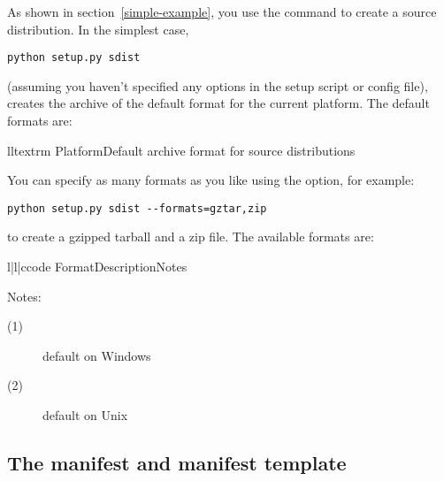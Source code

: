\documentclass{howto}
\begin{document}
As shown in section~\ref{simple-example}, you use the
 command to create a source distribution.  In the
simplest case,
\begin{verbatim}
python setup.py sdist
\end{verbatim}
(assuming you haven't specified any  options in the setup
script or config file),  creates the archive of the
default format for the current platform.  The default formats are:
\begin{tableii}{ll}{textrm}%
  {Platform}{Default archive format for source distributions}
\end{tableii}
You can specify as many formats as you like using the
 option, for example:
\begin{verbatim}
python setup.py sdist --formats=gztar,zip
\end{verbatim}
to create a gzipped tarball and a zip file.  The available formats are:
\begin{tableiii}{l|l|c}{code}%
  {Format}{Description}{Notes}
\end{tableiii}

\noindent Notes:
\begin{description}
\item[(1)] default on Windows
\item[(2)] default on Unix
\end{description}


\subsection{The manifest and manifest template}
\label{manifest}
\end{document}
